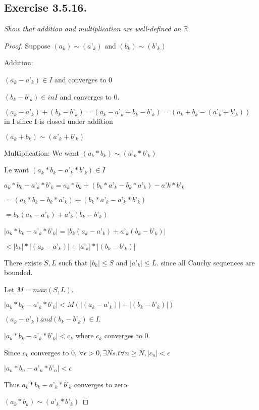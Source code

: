 \documentclass[12pt, a4paper]{article}
\begin{document}
    \subsection*{Exercise 3.5.16.}
        \textit{Show that addition and multiplication are well-defined on} $\mathbb{R}$
        \begin{proof}
            Suppose $(a_k)\sim (a’_k)$ and $(b_k)\sim (b’_k)$

            Addition:

            $(a_k-a’_k) \in I$ and converges to 0

            $(b_k - b’_k) \in in I$ and converges to 0. 

            $(a_k-a’_k) + (b_k - b’_k) = (a_k-a’_k + b_k - b’_k) = (a_k+b_k - (a’_k+b’_k))$ in I since I is closed under addition

            $(a_k+b_k ) \sim (a’_k+b’_k)$

            Multiplication: We want $(a_k*b_k) \sim (a’_k * b’_k)$

            I.e want $(a_k*b_k-a’_k * b’_k) \in I$

            $a_k*b_k-a’_k * b’_k = a_k*b_k+(b_k*a’_k - b_k*a’_k) - a’k*b’_k$

            $= (a_k*b_k - b_k*a’_k) + (b_k*a’_k - a’_k*b’_k)$

            $=b_k(a_k-a’_k) + a’_k(b_k-b’_k)$

            |$a_k*b_k-a’_k * b’_k| = | b_k(a_k-a’_k) + a’_k(b_k-b’_k)|$

            $< | b_k|*|(a_k-a’_k)|+ |a’_k|*|(b_k-b’_k)|$

            There exists $S,L$ such that $|b_k| \le S$ and $|a’_k| \le L.$ since all Cauchy sequences are bounded. 

            Let $M = max(S,L).$ 

            $|a_k*b_k-a’_k * b’_k| < M(|(a_k-a’_k)|+ |(b_k-b’_k)|)$ 

            $(a_k-a’_k) and (b_k-b’_k) \in I.$

            $|a_k*b_k-a’_k * b’_k| < c_k$ where $c_k$ converges to 0.

            Since $c_k$ converges to 0, $\forall \epsilon > 0, \exists N s.t \forall n\ge N, |c_n| < \epsilon$

            $|a_n*b_n-a’_n * b’_n| < \epsilon$ 

            Thus $a_k*b_k-a’_k * b’_k$ converges to zero.

            $(a_k*b_k) \sim (a’_k * b’_k)$
        \end{proof}
\end{document}
